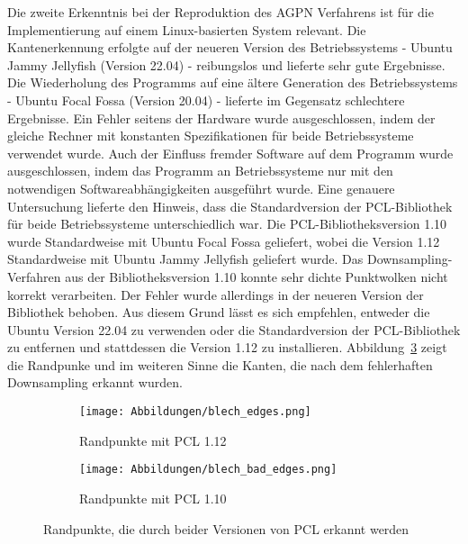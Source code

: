Die zweite Erkenntnis bei der Reproduktion des AGPN Verfahrens ist für die Implementierung auf einem Linux-basierten System relevant. Die Kantenerkennung erfolgte auf der neueren Version des Betriebssystems - Ubuntu Jammy Jellyfish (Version 22.04) - reibungslos und lieferte sehr gute Ergebnisse. Die Wiederholung des Programms auf eine ältere Generation des Betriebssystems - Ubuntu Focal Fossa (Version 20.04) - lieferte im Gegensatz schlechtere Ergebnisse. Ein Fehler seitens der Hardware wurde ausgeschlossen, indem der gleiche Rechner mit konstanten Spezifikationen für beide Betriebssysteme verwendet wurde. Auch der Einfluss fremder Software auf dem Programm wurde ausgeschlossen, indem das Programm an Betriebssysteme nur mit den notwendigen Softwareabhängigkeiten ausgeführt wurde. Eine genauere Untersuchung lieferte den Hinweis, dass die Standardversion der PCL-Bibliothek für beide Betriebssysteme unterschiedlich war. Die PCL-Bibliotheksversion 1.10 wurde Standardweise mit Ubuntu Focal Fossa geliefert, wobei die Version 1.12 Standardweise mit Ubuntu Jammy Jellyfish geliefert wurde. Das Downsampling-Verfahren aus der Bibliotheksversion 1.10 konnte sehr dichte Punktwolken nicht korrekt verarbeiten. Der Fehler wurde allerdings in der neueren Version der Bibliothek behoben. Aus diesem Grund lässt es sich empfehlen, entweder die Ubuntu Version 22.04 zu verwenden oder die Standardversion der PCL-Bibliothek zu entfernen und stattdessen die Version 1.12 zu installieren. Abbildung~\ref{fig: pcl_version_comparision} zeigt die Randpunke und im weiteren Sinne die Kanten, die nach dem fehlerhaften Downsampling erkannt wurden.


\begin{figure}[t]
	\centering
	\begin{subfigure}[h]{0.49\textwidth}
		\texttt{[image: Abbildungen/blech\_edges.png]}
		\centering
		\caption{Randpunkte mit PCL 1.12}
		\label{fig: blech_edges}
	\end{subfigure}
	\hfill
	\begin{subfigure}[h]{0.49\textwidth}
		\texttt{[image: Abbildungen/blech\_bad\_edges.png]}
		\centering
		\caption{Randpunkte mit PCL 1.10}
		\label{fig: bad_edges}
	\end{subfigure}
	\caption[Einfluss der Softwareversion auf dem Verfahren]{Randpunkte, die durch beider Versionen von PCL erkannt werden}
	\label{fig: pcl_version_comparision}
\end{figure}

